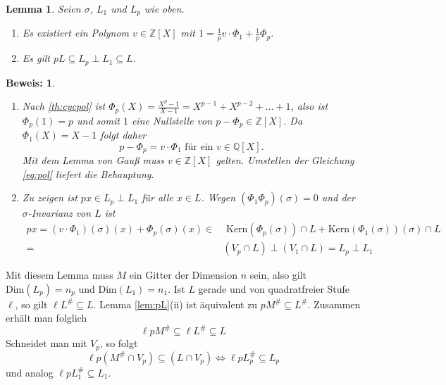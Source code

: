 \documentclass[12pt,a4paper,halfparskip,headsepline,bibtotocnumbered]{scrreprt}
\theoremstyle{nummermitklammern}
\newtheorem{lemma}[defsatzusw]{Lemma}
\theoremstyle{nonumberbreak}
\newtheorem{beweis}{Beweis:}
\newcommand{\Z}{\mathbb{Z}}
\newcommand{\Q}{\mathbb{Q}}
\newcommand{\Kern}{\text{Kern}}
\begin{document}
\begin{framed}
	\begin{lemma}\label{lem:pL}
		Seien $\sigma$, $L_1$ und $L_p$ wie oben.
		\begin{enumerate}[label=(\roman*)]
			\item Es existiert ein Polynom $v \in \Z\left[ X \right]$ mit $1 = \frac{1}{p} v \cdot \Phi_1 + \frac{1}{p}\Phi_p$.
			\item Es gilt $pL \subseteq L_p \perp L_1 \subseteq L$.
		\end{enumerate}
	\end{lemma}
\end{framed}

\begin{beweis}
	\begin{enumerate}[label=(\roman*)]
		\item Nach \eqref{th:cycpol} ist $\Phi_p(X) = \frac{X^p-1}{X-1} = X^{p-1} + X^{p-2} + \dots + 1$, also ist $\Phi_p(1) = p$ und somit $1$ eine Nullstelle von $p - \Phi_p \in \Z\left[ X \right]$. Da $\Phi_1(X) = X-1$ folgt daher 
			\begin{equation}\label{eq:pol}
				p - \Phi_p = v \cdot\Phi_1 \text{ für ein } v \in \Q\left[X\right].
			\end{equation}
			Mit dem Lemma von Gauß muss $v \in \Z \left[ X \right]$ gelten. Umstellen der Gleichung \eqref{eq:pol} liefert die Behauptung.
		\item Zu zeigen ist $p x \in L_p \perp L_1$ für alle $x \in L$. Wegen $(\Phi_1 \Phi_p)(\sigma) = 0$ und der $\sigma$-Invarianz von $L$ ist
			\begin{align*}
				px = (v \cdot \Phi_1)(\sigma)(x) + \Phi_p(\sigma)(x) \in &\text{ Kern}(\Phi_p(\sigma)) \cap L + \Kern(\Phi_1(\sigma))(\sigma) \cap L\\
				=& (V_p \cap L) \perp (V_1 \cap L) = L_p \perp L_1
			\end{align*}
	\end{enumerate}
\end{beweis}

Mit diesem Lemma muss $M$ ein Gitter der Dimension $n$ sein, also gilt $\text{Dim}(L_p) = n_p$ und $\text{Dim}(L_1) = n_1$. Ist $L$ gerade und von quadratfreier Stufe $\ell$, so gilt $\ell L^\# \subseteq L$. Lemma \eqref{lem:pL}(ii) ist äquivalent zu $p M^\# \subseteq L^\#$. Zusammen erhält man folglich
\begin{equation*}
	\ell p M^\# \subseteq \ell L^\# \subseteq L
\end{equation*}
Schneidet man mit $V_p$, so folgt
\begin{equation*}
	\ell p (M^\# \cap V_p) \subseteq (L \cap V_p) \Leftrightarrow \ell p L_p^\# \subseteq L_p
\end{equation*}
und analog $\ell p L_1^\# \subseteq L_1$.
\end{document}
